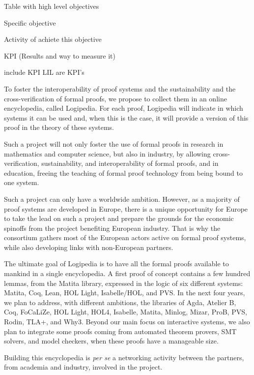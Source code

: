 Table with
high level objectives

Specific objective

Activity of achiete this objective

KPI (Results and way to measure it)





{\color{red} include KPI} LIL are KPI's





To foster the interoperability of proof systems and the sustainability
and the cross-verification of formal proofs, we propose to collect
them in an online encyclopedia, called Logipedia.  For each proof,
Logipedia will indicate in which systems it can be used and, when this
is the case, it will provide a version of this proof in the theory of
these systems.

Such a project will not only foster the use of formal proofs in
research in mathematics and computer science, but also in industry, by
allowing cross-verification, sustainability, and interoperability of
formal proofs, and in education, freeing the teaching of formal proof
technology from being bound to one system.

Such a project can only have a worldwide ambition. However, as a
majority of proof systems are developed in Europe, there is a unique
opportunity for Europe to take the lead on such a project and prepare
the grounds for the economic spinoffs from the project benefiting
European industry. That is why the consortium gathers most of the
European actors active on formal proof systems, while also developing
links with non-European partners.

The ultimate goal of Logipedia is to have all the formal proofs
available to mankind in a single encyclopedia.  A first proof of
concept contains a few hundred lemmas, from the Matita library,
expressed in the logic of six different systems: Matita, Coq, Lean,
HOL Light, Isabelle/HOL, and PVS.  In the next four years, we plan to
address, with different ambitions, the libraries of Agda, Atelier B,
Coq, FoCaLiZe, HOL Light, HOL4, Isabelle, Matita, Minlog, Mizar, ProB,
PVS, Rodin, TLA+, and Why3.  Beyond our main focus on interactive
systems, we also plan to integrate some proofs coming from automated
theorem provers, SMT solvers, and model checkers, when these proofs
have a manageable size.

Building this encyclopedia is {\em per se} a networking activity
between the partners, from academia and industry, involved in the
project.


